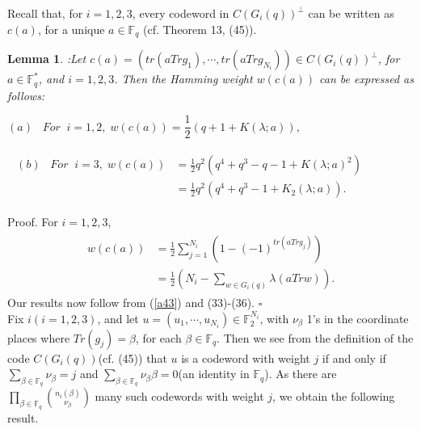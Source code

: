 \documentclass[a4,12pt]{elsart}
\newtheorem{lemma}[theorem]{Lemma}
\begin{document}
Recall that, for $i=1, 2, 3$, every codeword in $C(G_i(q))^\bot$ can
be written as $c(a)$, for a unique $a \in {\mathbb{F}}_q$ (cf. Theorem 13,
(45)).

\begin{lemma}:\label{O}
Let $c(a)=(tr(aTrg_1),\cdots,tr(aTr g_{N_i})) \in C(G_i(q))^{\bot}$,
for $ a \in {\mathbb{F}}_q^{*}$, and  $i=1, 2, 3$. Then the Hamming weight
$w(c(a))$ can be expressed as follows:

\begin{equation}\label{a49}
(a) \;\;\;For \;\; i=1, 2,\; w(c(a))= \frac{ 1}{2 }(q +1 +K
(\lambda;a )), \qquad \qquad\qquad\qquad\qquad
\end{equation}

\begin{align}\label{a50}
\begin{split}
(b)\;\;\; For \;\; i=3, \;w(c(a))&=\frac{ 1}{2 }q^2(q^4 +q^3 -q -1 +K (\lambda; a )^2 )\\
                    &=\frac{ 1}{2 }q^2(q^4 +q^3 -1 + K_2 ( \lambda; a)).
                    \qquad\qquad\qquad \;\;
 \end{split}
\end{align}
\end{lemma}

{{\sc Proof.} \enspace} For $ i=1, 2, 3$,
\begin{align*}
\begin{split}
 w(c(a))&=\frac{ 1}{2 } \sum_{j=1}^{N_i }(1-(-1)^{tr(aTrg_j )})\\
           &=\frac{ 1}{ 2}(N_i- \sum_{w \in G_i(q)} \lambda (a Tr w)).
\end{split}
\end{align*}
Our results now follow from (\ref{a43}) and (33)-(36).
\qquad\qquad\qquad\qquad \qquad\qquad$\square$\\

Fix $i(i=1, 2, 3)$, and let $u=(u_1, \cdots , u_{N_{i}}) \in
{\mathbb{F}}_2^{N_{i}}$,
 with $\nu_\beta$ 1's in the coordinate places where $ Tr(g_j )=
\beta$, for each $ \beta \in {\mathbb{F}}_q$. Then we see from the definition
of the code $C(G_i(q))$(cf. (45)) that $u$ is a codeword with weight
$j$ if and only if $ \sum_{\beta \in {\mathbb{F}}_{q}}^{}  \nu_{\beta }=j$
and $\sum_{\beta \in {\mathbb{F}}_{q}} ^{} \nu_{\beta} \beta =0$(an identity
in $ {\mathbb{F}}_q$). As there are $\prod_{\beta \in {\mathbb{F}}_q} \binom{n_i(
\beta)}{ \nu_\beta}$ many such codewords with weight $j$, we obtain
the following result.
\end{document}
